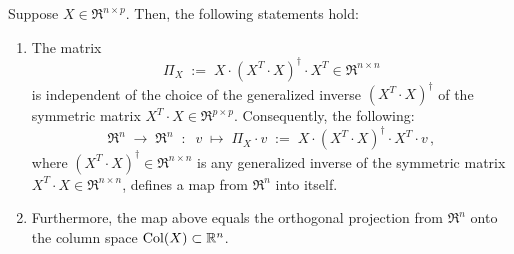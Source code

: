 \begin{theorem}
\mbox{}\vskip 0.1cm\noindent
Suppose $X \in \Re^{n \times p}$.
Then, the following statements hold:
\begin{enumerate}
\item
	The matrix
	\begin{equation*}
		\Pi_{X} \;:=\; X \cdot (X^{T} \cdot X)^{\dagger} \cdot X^{T} \in \Re^{n \times n}
	\end{equation*}
	is independent of the choice of the generalized inverse $(X^{T} \cdot X)^{\dagger}$
	of the symmetric matrix $X^{T} \cdot X \in \Re^{p \times p}$.
	Consequently, the following:
	\begin{equation*}
	\Re^{n} \; \longrightarrow \; \Re^{n}
	\;\; : \;\;
	v \; \longmapsto \; \Pi_{X}\cdot v \;:=\;X \cdot (X^{T} \cdot X)^{\dagger} \cdot X^{T} \cdot v\,,
	\end{equation*}
	where $(X^{T} \cdot X)^{\dagger} \in \Re^{n \times n}$
	is any generalized inverse of the symmetric matrix
	$X^{T} \cdot X \in \Re^{n \times n}$, defines a map from $\Re^{n}$ into itself.
\item
	Furthermore, the map above equals the orthogonal projection
	from $\Re^{n}$ onto the column space $\textnormal{Col}(X) \subset \mathbb{R}^{n}$.
\end{enumerate}
\end{theorem}
\proof
